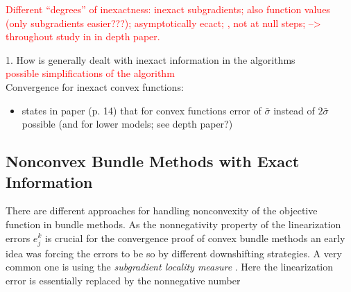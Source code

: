 \textcolor{red}{Different ``degrees'' of inexactness: inexact subgradients; also function values (only subgradients easier???); asymptotically ecact; , not at null steps;  --> throughout study in in depth paper.}

1. How is generally dealt with inexact information in the algorithms \\

\textcolor{red}{possible simplifications of the algorithm} \\
Convergence for inexact convex functions:
\begin{itemize}
	\item states in paper \cite{Hare2016} (p. 14) that for convex functions error of \(\bar{\sigma}\) instead of \(2\bar{\sigma}\) possible (and for lower models; see depth paper?)
\end{itemize}


\subsection{Nonconvex Bundle Methods with Exact Information}

There are different approaches for handling nonconvexity of the objective function in bundle methods.
As the nonnegativity property of the linearization errors \(e_j^k\) is crucial for the convergence proof of convex bundle methods an early idea was forcing the errors to be so by different downshifting strategies. A very common one is using the \emph{subgradient locality measure} \cite{Kiwiel1986, Mifflin1982}. Here the linearization error is essentially replaced by the nonnegative number


